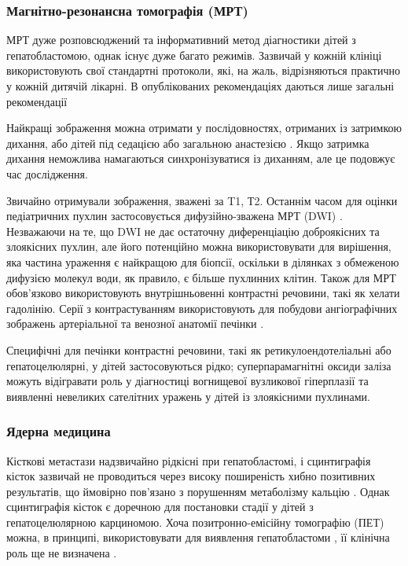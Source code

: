 \subsubsection{Магнітно-резонансна томографія (МРТ)} 

МРТ дуже розповсюджений та інформативний метод діагностики дітей з гепатобластомою, однак існує дуже багато режимів. Зазвичай у кожній клініці використовують свої стандартні протоколи, які, на жаль, відрізняються практично у кожній дитячій лікарні. В опублікованих рекомендаціях даються лише загальні рекомендації \cite{pmid18975296}

Найкращі зображення можна отримати у послідовностях, отриманих із затримкою дихання, або дітей під седацією або загальною анастезією \cite{pmid19040959}. Якщо затримка дихання неможлива намагаються синхронізуватися із диханням, але це подовжує час дослідження.

Звичайно отримували зображення, зважені за T1,  Т2. Останнім часом для оцінки педіатричних пухлин застосовується дифузійно-зважена МРТ (DWI) \cite{pmid20070564}. Незважаючи на те, що DWI не дає остаточну диференціацію доброякісних та злоякісних пухлин, але його потенційно можна використовувати для вирішення, яка частина ураження є найкращою для біопсії, оскільки в ділянках з обмеженою дифузією молекул води, як правило, є більше пухлинних клітин. Також для МРТ обов’язково використовують внутрішньовенні контрастні речовини, такі як хелати гадолінію. Серії з контрастуванням використовують для побудови ангіографічних зображень артеріальної та венозної анатомії печінки \cite{pmid20223320}.

Специфічні для печінки контрастні речовини, такі як ретикулоендотеліальні або гепатоцелюлярні, у дітей застосовуються рідко; суперпарамагнітні оксиди заліза можуть відігравати роль у діагностиці вогнищевої вузликової гіперплазії та виявленні невеликих сателітних уражень у дітей із злоякісними пухлинами.

\subsubsection{Ядерна медицина} 

Кісткові метастази надзвичайно рідкісні при гепатобластомі, і сцинтиграфія кісток зазвичай не проводиться через високу поширеність хибно позитивних результатів, що ймовірно пов'язано з порушенням метаболізму кальцію \cite{pmid20345611}. Однак сцинтиграфія кісток є доречною для постановки стадії у дітей з гепатоцелюлярною карциномою.
Хоча позитронно-емісійну томографію (ПЕТ) можна, в принципі, використовувати для виявлення гепатобластоми \cite{pmid20406943}, її клінічна роль ще не визначена \cite{pmid20438949}.
